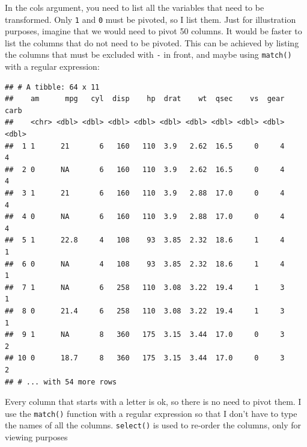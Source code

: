 \documentclass[]{gitbook}
\newenvironment{Shaded}{\begin{snugshade}}{\end{snugshade}}
\newcommand{\DataTypeTok}[1]{\textcolor[rgb]{0.13,0.29,0.53}{#1}}
\newcommand{\KeywordTok}[1]{\textcolor[rgb]{0.13,0.29,0.53}{\textbf{#1}}}
\newcommand{\NormalTok}[1]{#1}
\newcommand{\OperatorTok}[1]{\textcolor[rgb]{0.81,0.36,0.00}{\textbf{#1}}}
\newcommand{\StringTok}[1]{\textcolor[rgb]{0.31,0.60,0.02}{#1}}
\begin{document}
In the cols argument, you need to list all the variables that need to be transformed. Only \texttt{1} and
\texttt{0} must be pivoted, so I list them. Just for illustration purposes, imagine that we would need
to pivot 50 columns. It would be faster to list the columns that do not need to be pivoted. This
can be achieved by listing the columns that must be excluded with \texttt{-} in front, and maybe using
\texttt{match()} with a regular expression:

\begin{Shaded}
\end{Shaded}

\begin{verbatim}
## # A tibble: 64 x 11
##    am      mpg   cyl  disp    hp  drat    wt  qsec    vs  gear  carb
##    <chr> <dbl> <dbl> <dbl> <dbl> <dbl> <dbl> <dbl> <dbl> <dbl> <dbl>
##  1 1      21       6   160   110  3.9   2.62  16.5     0     4     4
##  2 0      NA       6   160   110  3.9   2.62  16.5     0     4     4
##  3 1      21       6   160   110  3.9   2.88  17.0     0     4     4
##  4 0      NA       6   160   110  3.9   2.88  17.0     0     4     4
##  5 1      22.8     4   108    93  3.85  2.32  18.6     1     4     1
##  6 0      NA       4   108    93  3.85  2.32  18.6     1     4     1
##  7 1      NA       6   258   110  3.08  3.22  19.4     1     3     1
##  8 0      21.4     6   258   110  3.08  3.22  19.4     1     3     1
##  9 1      NA       8   360   175  3.15  3.44  17.0     0     3     2
## 10 0      18.7     8   360   175  3.15  3.44  17.0     0     3     2
## # ... with 54 more rows
\end{verbatim}

Every column that starts with a letter is ok, so there is no need to pivot them. I use the \texttt{match()}
function with a regular expression so that I don't have to type the names of all the columns. \texttt{select()}
is used to re-order the columns, only for viewing purposes
\end{document}
